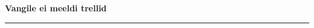 \documentclass[10pt]{book}
\begin{document}
{
  \samepage
  \raggedbottom
  \raggedright
  \sloppy


  \vspace{0.2in}

  \noindent\begin{minipage}{.1\textwidth}
    \hfill\vspace{0.1in}
  \end{minipage}%
  \noindent\begin{minipage}{.8\textwidth}
    \centering
    \bfseries
    \large Vangile ei meeldi trellid
  \end{minipage}%
  \noindent\begin{minipage}{.1\textwidth}
      \hfill\vspace{0.1in}
  \end{minipage}

  \nopagebreak[4]
  \vspace{0.1in}
  \nopagebreak[4]
  \hrule height 0.05ex
  \nopagebreak[4]
  \vspace{-0.05in}




}
\end{document}
